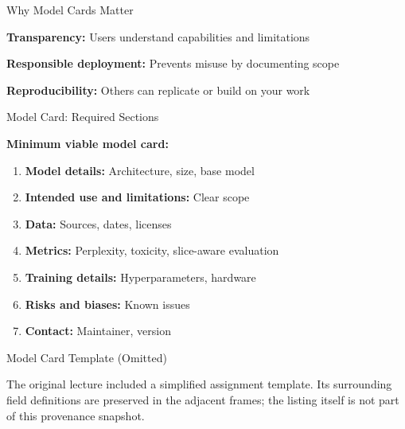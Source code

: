 \documentclass[xcolor=svgnames, 10pt, handout]{beamer}
\begin{document}
\begin{frame}{Why Model Cards Matter}

\textbf{Transparency:} Users understand capabilities and limitations

\pause

\textbf{Responsible deployment:} Prevents misuse by documenting scope

\pause


\textbf{Reproducibility:} Others can replicate or build on your work

\pause


\end{frame}

\begin{frame}{Model Card: Required Sections}

\textbf{Minimum viable model card:}

\begin{enumerate}
\item \textbf{Model details:} Architecture, size, base model
\pause
\item \textbf{Intended use and limitations:} Clear scope
\pause
\item \textbf{Data:} Sources, dates, licenses
\pause
\item \textbf{Metrics:} Perplexity, toxicity, slice-aware evaluation
\pause
\item \textbf{Training details:} Hyperparameters, hardware
\pause
\item \textbf{Risks and biases:} Known issues
\pause
\item \textbf{Contact:} Maintainer, version
\end{enumerate}

\end{frame}

\begin{frame}{Model Card Template (Omitted)}


The original lecture included a simplified assignment template. Its surrounding
field definitions are preserved in the adjacent frames; the listing itself is not
part of this provenance snapshot.

\end{frame}
\end{document}
